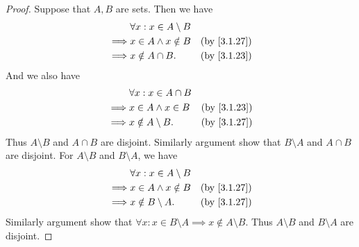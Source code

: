 \begin{proof}
  Suppose that \(A, B\) are sets.
  Then we have
  \begin{align*}
             & \forall x : x \in A \setminus B                             \\
    \implies & x \in A \land x \notin B        & \text{(by \cref{3.1.27})} \\
    \implies & x \notin A \cap B.              & \text{(by \cref{3.1.23})}
  \end{align*}
  And we also have
  \begin{align*}
             & \forall x : x \in A \cap B                             \\
    \implies & x \in A \land x \in B      & \text{(by \cref{3.1.23})} \\
    \implies & x \notin A \setminus B.    & \text{(by \cref{3.1.27})}
  \end{align*}
  Thus \(A \setminus B\) and \(A \cap B\) are disjoint.
  Similarly argument show that \(B \setminus A\) and \(A \cap B\) are disjoint.
  For \(A \setminus B\) and \(B \setminus A\), we have
  \begin{align*}
             & \forall x : x \in A \setminus B                             \\
    \implies & x \in A \land x \notin B        & \text{(by \cref{3.1.27})} \\
    \implies & x \notin B \setminus A.         & \text{(by \cref{3.1.27})}
  \end{align*}
  Similarly argument show that \(\forall x : x \in B \setminus A \implies x \notin A \setminus B\).
  Thus \(A \setminus B\) and \(B \setminus A\) are disjoint.


\end{proof}
